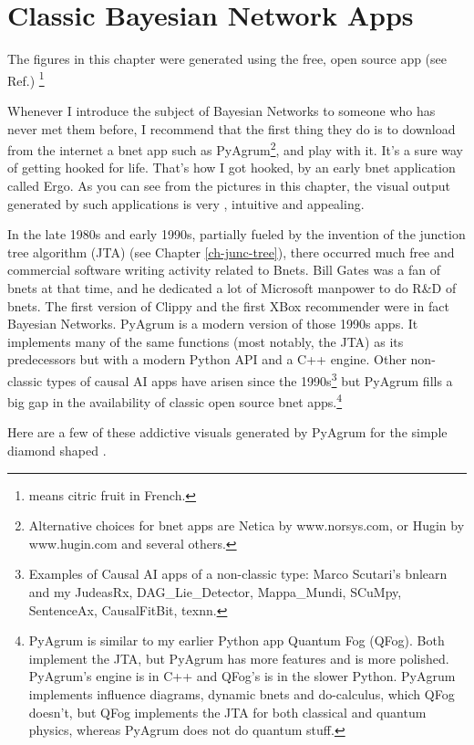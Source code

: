 \chapter{Classic Bayesian Network Apps}
\label{ch-bnet-apps}

The figures in this chapter were generated using
the free, open source app  (see Ref.\cite{pyagrum})
\footnote{ means citric fruit in French. }


Whenever I introduce the subject of Bayesian Networks
to someone who has never met them before, I recommend that the first thing they do is to
download from the internet a  bnet app  such as
PyAgrum\footnote{Alternative choices for bnet apps are Netica by www.norsys.com, or Hugin by www.hugin.com and several others.}, and play with it. It's a sure way of getting hooked
for life. That's how I got hooked, by an early bnet application called Ergo. As you can see from the pictures in this chapter,
the visual output generated by such applications is very ,
 intuitive and appealing.

  
In the late 1980s and early 1990s, partially fueled by the invention of
the junction tree algorithm (JTA) (see Chapter \ref{ch-junc-tree}), there
occurred much free and commercial software writing activity related to Bnets. Bill Gates was a fan of bnets at that time, and he dedicated a lot of Microsoft manpower to do R\&D of bnets. The first version of Clippy and the first XBox recommender were in fact Bayesian Networks. PyAgrum is a modern version of those  1990s apps. It implements many of the same functions (most notably, the JTA) as its predecessors but with a modern Python API and a C++ engine. Other non-classic types of causal AI apps have arisen since the 1990s\footnote{Examples of Causal AI apps of a non-classic type:  Marco Scutari's bnlearn and my JudeasRx, DAG\_Lie\_Detector, Mappa\_Mundi, SCuMpy, SentenceAx, CausalFitBit, texnn.} but PyAgrum fills a big gap in the availability of classic open source bnet apps.\footnote{PyAgrum is similar to my earlier Python app Quantum Fog (QFog). Both implement the JTA, but PyAgrum  has more features and is more polished.
PyAgrum's engine is in C++ and QFog's is in the slower Python.  PyAgrum implements influence diagrams, dynamic bnets
and do-calculus, which QFog doesn't, but QFog implements the JTA for both classical and quantum physics, whereas PyAgrum does not do quantum stuff.}

Here are a few of these addictive visuals generated by PyAgrum
for the simple diamond shaped  .

